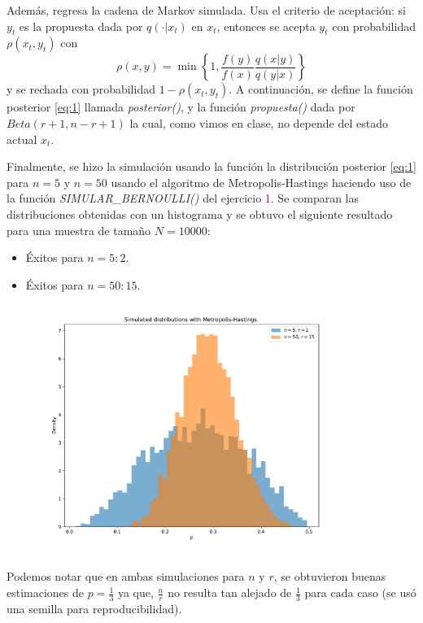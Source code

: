Además, regresa la cadena de Markov simulada. Usa el criterio de aceptación: si $y_t$ es la propuesta dada por $q(\cdot|x_t)$ en $x_t$, entonces se acepta $y_t$ con probabilidad $\rho(x_t, y_t)$ con
\begin{equation}
	\rho(x,y) = \min\left\{1, \frac{f(y)}{f(x)} \frac{q(x|y)}{q(y|x)} \right\}
\end{equation}
y se rechada con probabilidad $1-\rho(x_t, y_t)$. A continuación, se define la función posterior \eqref{eq:1} llamada \textit{posterior()}, y la función \textit{propuesta()} dada por $Beta(r+1, n-r+1)$ la cual, como vimos en clase, no depende del estado actual $x_t$.

Finalmente, se hizo la simulación usando la función la distribución posterior \eqref{eq:1} para $n = 5$ y $n = 50$ usando el algoritmo de Metropolis-Hastings haciendo uso de la función \textit{SIMULAR\_BERNOULLI()} del ejercicio \textcolor{Purple}{1}. Se comparan las distribuciones obtenidas con un histograma y se obtuvo el siguiente resultado para una muestra de tamaño $N = 10000$:

\begin{itemize}
	\item Éxitos para $n = 5: 2$.
	\item Éxitos para $n = 50: 15$.
\end{itemize}
\begin{figure}[h!]
	\centering
	\includegraphics[width=0.85\textwidth]{IMAGENES/MS_bernoulli.pdf}
\end{figure}

Podemos notar que en ambas simulaciones para $n$ y $r$, se obtuvieron buenas estimaciones de $p = \frac{1}{3}$ ya que, $\frac{n}{r}$ no resulta tan alejado de $\frac{1}{3}$ para cada caso (se usó una semilla para reproducibilidad). 

